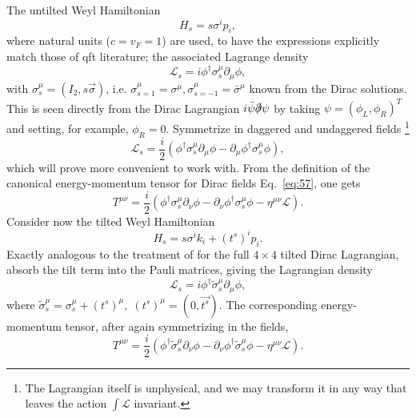 The untilted Weyl Hamiltonian
\begin{equation}
  H_s = s \sigma^i p_i,
\end{equation}
where natural units (\( c = v_F = 1 \)) are used, to have the expressions explicitly match those of \gls{qft} literature;
the associated Lagrange density \cite{kachelriessQuantumFieldsHubble2018}
\begin{equation}
  \mathcal{L}_s = i \phi^{\dagger} \sigma_s^{\mu} \partial_{\mu} \phi,
\end{equation}
with \( \sigma_s^{\mu} = (I_2, s \vec{\sigma}) \), i.e. \( \sigma_{s=1}^{\mu} = \sigma^{\mu}, \sigma_{s=-1}^{\mu} = \bar{\sigma}^{\mu} \) known from the Dirac solutions.
This is seen directly from the Dirac Lagrangian \( i \bar{\psi} \slashed{\partial} \psi \) by taking \( \psi = (\phi_L, \phi_R)^T \) and setting, for example, \( \phi_R = 0 \).
Symmetrize in daggered and undaggered fields
\footnote{The Lagrangian itself is unphysical, and we may transform it in any way that leaves the action \( \int \mathcal{L} \) invariant.}
\begin{equation}
  \mathcal{L}_s = \frac{i}{2} (\phi^{\dagger} \sigma_s^{\mu} \partial_{\mu} \phi - \partial_{\mu} \phi^{\dagger} \sigma_s^{\mu} \phi),
\end{equation}
which will prove more convenient to work with.
From the definition of the canonical energy-momentum tensor for Dirac fields Eq.~\eqref{eq:57}, one gets
\begin{equation}
  T^{\mu \nu} =
  \frac{i}{2} (
  \phi^{\dagger} \sigma_s^{\mu} \partial_{\nu} \phi
  - \partial_{\nu} \phi^{\dagger} \sigma_s^{\mu} \phi
  - \eta^{\mu \nu} \mathcal{L}
  ).
\end{equation}
Consider now the tilted Weyl Hamiltonian
\begin{equation}
  H_s = s \sigma^ik_i + (t^s)^i p_i.
\end{equation}
Exactly analogous to the treatment of \textcite{vanderwurffMagnetovorticalThermoelectricTransport2019} for the full \( 4 \times 4 \) tilted Dirac Lagrangian, absorb the tilt term into the Pauli matrices, giving the Lagrangian density
\begin{equation}
  \mathcal{L}_s = i \phi^{\dagger} \tilde{\sigma}_s^{\mu} \partial_{\mu} \phi,
\end{equation}
where \( \tilde{\sigma}_s^{\mu} = \sigma_s^{\mu} + (t^s)^{\mu}, \; (t^s)^{\mu} = (0, \vec{t^s}) \).
The corresponding energy-momentum tensor, after again symmetrizing in the fields,
\begin{equation}
  \label{eq:T-canon-tilt}
  T^{\mu\nu} =
  \frac{i}{2} (
  \phi^{\dagger} \tilde{\sigma}_s ^{\mu} \partial_{\nu} \phi
  - \partial_{\nu} \phi^{\dagger} \tilde{\sigma}_s ^{\mu} \phi
  - \eta^{\mu \nu} \mathcal{L}
  ).
\end{equation}
